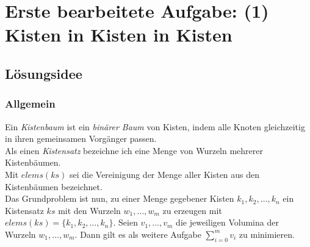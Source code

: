 \section{Erste bearbeitete Aufgabe: (1) Kisten in Kisten in Kisten}
\subsection{Lösungsidee}
\subsubsection{Allgemein}
Ein \emph{Kistenbaum} ist ein \emph{binärer Baum} von Kisten, indem alle Knoten gleichzeitig in ihren gemeinsamen Vorgänger passen.\\
Als einen \emph{Kistensatz} bezeichne ich eine Menge von Wurzeln mehrerer Kistenbäumen. \\
Mit \emph{$elems(ks)$} sei die Vereinigung der Menge aller Kisten aus den Kistenbäumen bezeichnet. \\
Das Grundproblem ist nun, zu einer Menge gegebener Kisten $k_1,k_2,\dots,k_n$
ein Kistensatz $ks$ mit den Wurzeln $w_1,\dots,w_m$ zu erzeugen mit $elems(ks) = \{k_1,k_2,\dots,k_n\}$.
Seien $v_1,\dots,v_m$ die jeweiligen Volumina der Wurzeln $w_1,\dots,w_m$.
Dann gilt es als weitere Aufgabe $\sum_{i=0}^{m}{v_i}$ zu minimieren.
